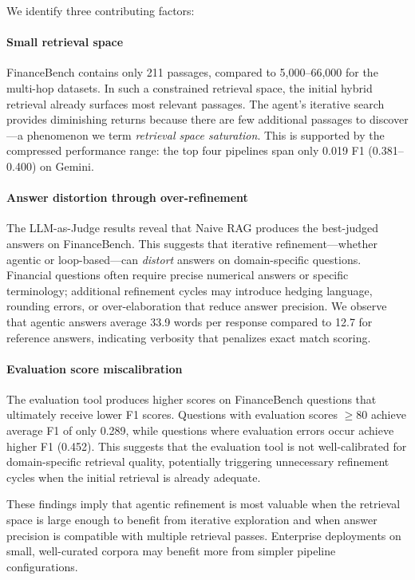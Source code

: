 We identify three contributing factors:

\paragraph{Small retrieval space}
FinanceBench contains only 211 passages, compared to 5,000--66,000 for the multi-hop datasets.
In such a constrained retrieval space, the initial hybrid retrieval already surfaces most relevant passages.
The agent's iterative search provides diminishing returns because there are few additional passages to discover---a phenomenon we term \emph{retrieval space saturation}.
This is supported by the compressed performance range: the top four pipelines span only 0.019 F1 (0.381--0.400) on Gemini.

\paragraph{Answer distortion through over-refinement}
The LLM-as-Judge results reveal that Naive RAG produces the best-judged answers on FinanceBench.
This suggests that iterative refinement---whether agentic or loop-based---can \emph{distort} answers on domain-specific questions.
Financial questions often require precise numerical answers or specific terminology; additional refinement cycles may introduce hedging language, rounding errors, or over-elaboration that reduce answer precision.
We observe that agentic answers average 33.9 words per response compared to 12.7 for reference answers, indicating verbosity that penalizes exact match scoring.

\paragraph{Evaluation score miscalibration}
The evaluation tool produces higher scores on FinanceBench questions that ultimately receive lower F1 scores.
Questions with evaluation scores $\geq 80$ achieve average F1 of only 0.289, while questions where evaluation errors occur achieve higher F1 (0.452).
This suggests that the evaluation tool is not well-calibrated for domain-specific retrieval quality, potentially triggering unnecessary refinement cycles when the initial retrieval is already adequate.

These findings imply that agentic refinement is most valuable when the retrieval space is large enough to benefit from iterative exploration and when answer precision is compatible with multiple retrieval passes.
Enterprise deployments on small, well-curated corpora may benefit more from simpler pipeline configurations.

